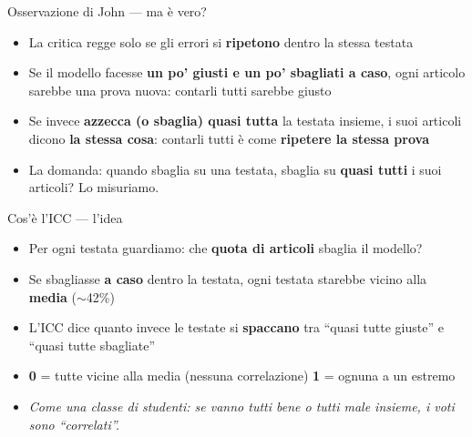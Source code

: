 \documentclass[aspectratio=169]{beamer}
\newcommand{\hl}[1]{\textbf{#1}}
\begin{document}
\begin{frame}{Osservazione di John --- ma \`e vero?}
  \vfill
  \begin{itemize}[<+->]
    \setlength\itemsep{0.8em}
    \item La critica regge solo se gli errori si \hl{ripetono} dentro la stessa testata
    \item Se il modello facesse \hl{un po' giusti e un po' sbagliati a caso}, ogni articolo sarebbe una prova nuova: contarli tutti sarebbe giusto
    \item Se invece \hl{azzecca (o sbaglia) quasi tutta} la testata insieme, i suoi articoli dicono \hl{la stessa cosa}: contarli tutti \`e come \hl{ripetere la stessa prova}
    \item La domanda: quando sbaglia su una testata, sbaglia su \hl{quasi tutti} i suoi articoli? \quad Lo misuriamo.
  \end{itemize}
  \vfill
\end{frame}

\begin{frame}{Cos'\`e l'ICC --- l'idea}
  \vfill
  \begin{itemize}[<+->]
    \setlength\itemsep{0.8em}
    \item Per ogni testata guardiamo: che \hl{quota di articoli} sbaglia il modello?
    \item Se sbagliasse \hl{a caso} dentro la testata, ogni testata starebbe vicino alla \hl{media} ($\sim$42\%)
    \item L'ICC dice quanto invece le testate si \hl{spaccano} tra ``quasi tutte giuste'' e ``quasi tutte sbagliate''
    \item \hl{0} = tutte vicine alla media (nessuna correlazione) \quad \hl{1} = ognuna a un estremo
    \item[] {\small\itshape Come una classe di studenti: se vanno tutti bene o tutti male insieme, i voti sono ``correlati''.}
  \end{itemize}
  \vfill
\end{frame}
\end{document}
